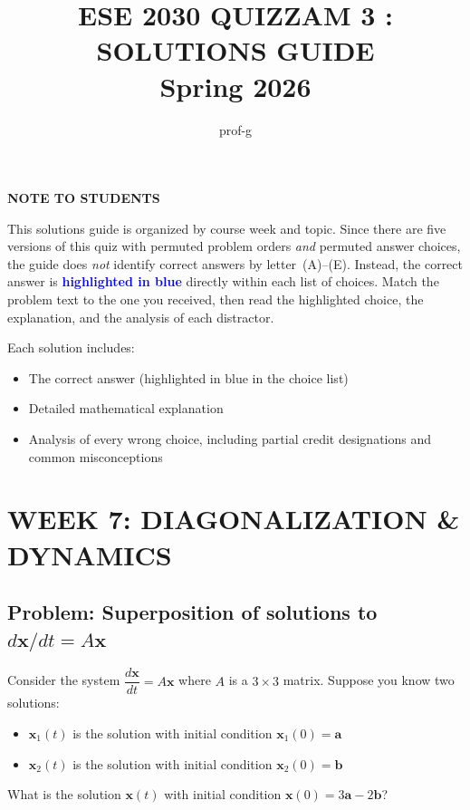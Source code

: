 \documentclass[12pt]{amsart}
\title{ESE 2030 QUIZZAM 3 : SOLUTIONS GUIDE \\ Spring 2026}
\author{prof-g}
\begin{document}
\maketitle

\begin{center}
{\bf NOTE TO STUDENTS}
\end{center}

This solutions guide is organized by course week and topic.
Since there are five versions of this quiz with permuted problem orders \emph{and}
permuted answer choices, the guide does \emph{not} identify correct answers by
letter~(A)--(E).
Instead, the correct answer is \textcolor{blue}{\textbf{highlighted in blue}}
directly within each list of choices.
Match the problem text to the one you received, then read the highlighted
choice, the explanation, and the analysis of each distractor.

Each solution includes:
\begin{itemize}
\item The correct answer (highlighted in blue in the choice list)
\item Detailed mathematical explanation
\item Analysis of every wrong choice, including partial credit designations and common misconceptions
\end{itemize}

\newpage

\section*{WEEK 7: DIAGONALIZATION \& DYNAMICS}

\subsection*{Problem: Superposition of solutions to $d\mathbf{x}/dt = A\mathbf{x}$}

Consider the system $\dfrac{d\mathbf{x}}{dt} = A\mathbf{x}$ where $A$ is a
$3 \times 3$ matrix. Suppose you know two solutions:
\begin{itemize}
\item $\mathbf{x}_1(t)$ is the solution with initial condition $\mathbf{x}_1(0) = \mathbf{a}$
\item $\mathbf{x}_2(t)$ is the solution with initial condition $\mathbf{x}_2(0) = \mathbf{b}$
\end{itemize}
What is the solution $\mathbf{x}(t)$ with initial condition $\mathbf{x}(0) = 3\mathbf{a} - 2\mathbf{b}$?
\end{document}
